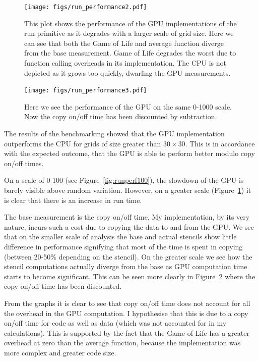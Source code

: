 \documentclass[
    12pt,
    a4paper,
    twoside,
    openright,
    ]{scrbook}
\begin{document}
\begin{figure}[h]
  \texttt{[image: figs/run\_performance2.pdf]}
  \caption{This plot shows the performance of the GPU implementations of the run
    primitive as it degrades with a larger scale of grid size. Here we can see
    that both the Game of Life and average function diverge from the base
    measurement. Game of Life degrades the worst due to function calling
    overheads in its implementation. The CPU is not depicted as it grows too
    quickly, dwarfing the GPU measurements. }
  \label{fig:runperf1000}
\end{figure}

\begin{figure}[h]
  \texttt{[image: figs/run\_performance3.pdf]}
  \caption{Here we see the performance of the GPU on the same 0-1000 scale. Now
    the copy on/off time has been discounted by subtraction.}
  \label{fig:runperf1000dis}
\end{figure}

The results of the benchmarking showed that the GPU implementation outperforms
the CPU for grids of size greater than $30 \times 30$. This is in accordance
with the expected outcome, that the GPU is able to perform better modulo copy
on/off times.

On a scale of 0-100 (see Figure~\ref{fig:runperf100}), the slowdown of the GPU
is barely visible above random variation. However, on a greater scale
(Figure~\ref{fig:runperf1000}) it is clear that there is an increase in run
time.

The base measurement is the copy on/off time. My implementation, by its very
nature, incurs such a cost due to copying the data to and from the GPU. We see
that on the smaller scale of analysis the base and actual stencils show little
difference in performance signifying that most of the time is spent in copying
(between 20-50\% depending on the stencil). On the greater scale we see how the
stencil computations actually diverge from the base as GPU computation time
starts to become significant. This can be seen more clearly in
Figure~\ref{fig:runperf1000dis} where the copy on/off time has been discounted.

From the graphs it is clear to see that copy on/off time does not account for
all the overhead in the GPU computation. I hypothesise that this is due to a
copy on/off time for code as well as data (which was not accounted for in my
calculations). This is supported by the fact that the Game of Life has a greater
overhead at zero than the average function, because the implementation was more
complex and greater code size.
\end{document}
